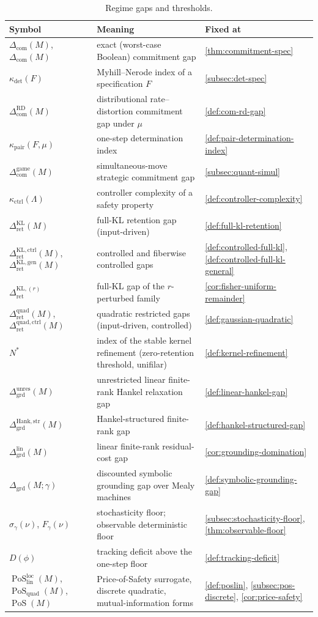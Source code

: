 \documentclass[12pt]{article}
\theoremstyle{definition}
\DeclareMathOperator{\PoS}{PoS}
\newcommand{\RetKL}{\Delta_{\mathrm{ret}}^{\mathrm{KL}}}
\newcommand{\RetQuad}{\Delta_{\mathrm{ret}}^{\mathrm{quad}}}
\newcommand{\GrdLin}{\Delta_{\mathrm{grd}}^{\mathrm{lin}}}
\newcommand{\Dunres}{\Delta_{\mathrm{grd}}^{\mathrm{unres}}}
\newcommand{\DHankstr}{\Delta_{\mathrm{grd}}^{\mathrm{Hank,str}}}
\newcommand{\Com}{\Delta_{\mathrm{com}}}
\newcommand{\Comex}{\Com}
\newcommand{\ComRD}{\Delta_{\mathrm{com}}^{\mathrm{RD}}}
\newcommand{\ComGame}{\Delta_{\mathrm{com}}^{\mathrm{game}}}
\newcommand{\PoSlin}{\PoS_{\mathrm{lin}}^{\mathrm{loc}}}
\newcommand{\PoSquad}{\PoS_{\mathrm{quad}}}
\newcommand{\RetKLr}[1]{\Delta_{\mathrm{ret}}^{\mathrm{KL},(#1)}}
\newcommand{\RetKLc}{\Delta_{\mathrm{ret}}^{\mathrm{KL,ctrl}}}
\newcommand{\RetQuadc}{\Delta_{\mathrm{ret}}^{\mathrm{quad,ctrl}}}
\newcommand{\RetKLg}{\Delta_{\mathrm{ret}}^{\mathrm{KL,gen}}}
\begin{document}
\begin{table}[htbp]
\centering
\small
\caption{Regime gaps and thresholds.}
\label{tab:notation-gaps}
\begin{tabular}{@{}p{3.5cm}p{7.7cm}p{2.8cm}@{}}
\toprule
\textbf{Symbol} & \textbf{Meaning} & \textbf{Fixed at} \\
\midrule
$\Com(M)$, $\Comex(M)$ & exact (worst-case Boolean) commitment gap &
\ref{thm:commitment-spec} \\[2pt]
$\kappa_{\det}(F)$ & Myhill--Nerode index of a specification $F$ &
\ref{subsec:det-spec} \\[2pt]
$\ComRD(M)$ & distributional rate--distortion commitment gap under $\mu$ &
\ref{def:com-rd-gap} \\[2pt]
$\kappa_{\mathrm{pair}}(F,\mu)$ & one-step determination index &
\ref{def:pair-determination-index} \\[2pt]
$\ComGame(M)$ & simultaneous-move strategic commitment gap &
\ref{subsec:quant-simul} \\[2pt]
$\kappa_{\mathrm{ctrl}}(\Lambda)$ & controller complexity of a safety
property & \ref{def:controller-complexity} \\[2pt]
$\RetKL(M)$ & full-KL retention gap (input-driven) &
\ref{def:full-kl-retention} \\[2pt]
$\RetKLc(M)$, $\RetKLg(M)$ & controlled and fiberwise controlled gaps &
\ref{def:controlled-full-kl}, \ref{def:controlled-full-kl-general} \\[2pt]
$\RetKLr{r}$ & full-KL gap of the $r$-perturbed family &
\ref{cor:fisher-uniform-remainder} \\[2pt]
$\RetQuad(M)$, $\RetQuadc(M)$ & quadratic restricted gaps (input-driven,
controlled) & \ref{def:gaussian-quadratic} \\[2pt]
$N^{\ast}$ & index of the stable kernel refinement (zero-retention
threshold, unifilar) & \ref{def:kernel-refinement} \\[2pt]
$\Dunres(M)$ & unrestricted linear finite-rank Hankel relaxation gap &
\ref{def:linear-hankel-gap} \\[2pt]
$\DHankstr(M)$ & Hankel-structured finite-rank gap &
\ref{def:hankel-structured-gap} \\[2pt]
$\GrdLin(M)$ & linear finite-rank residual-cost gap &
\ref{cor:grounding-domination} \\[2pt]
$\Delta_{\mathrm{grd}}(M;\gamma)$ & discounted symbolic grounding gap over
Mealy machines & \ref{def:symbolic-grounding-gap} \\[2pt]
$\sigma_\gamma(\nu)$, $F_\gamma(\nu)$ & stochasticity floor; observable
deterministic floor & \ref{subsec:stochasticity-floor},
\ref{thm:observable-floor} \\[2pt]
$D(\phi)$ & tracking deficit above the one-step floor &
\ref{def:tracking-deficit} \\[2pt]
$\PoSlin(M)$, $\PoSquad(M)$, $\operatorname{PoS}(M)$ & Price-of-Safety
surrogate, discrete quadratic, mutual-information forms &
\ref{def:poslin}, \ref{subsec:pos-discrete}, \ref{cor:price-safety} \\
\bottomrule
\end{tabular}
\end{table}
\end{document}
